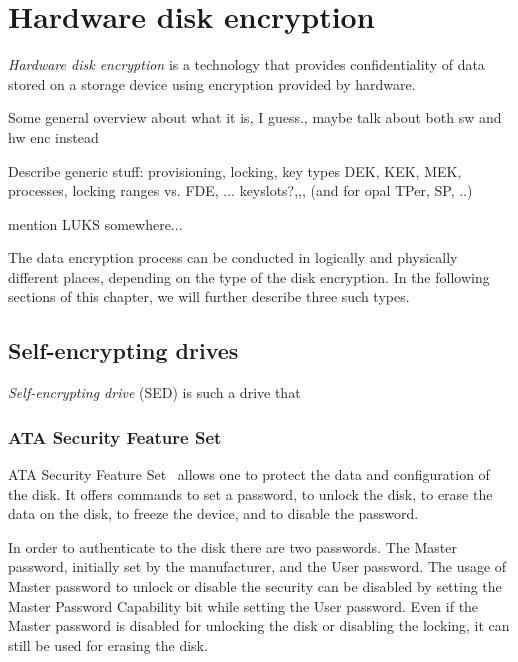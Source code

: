 
\chapter{Hardware disk encryption}

\emph{Hardware disk encryption} is a technology that provides confidentiality of data stored on a storage device using encryption provided by hardware.

Some general overview about what it is, I guess., maybe talk about both sw and hw enc instead

Describe generic stuff: provisioning, locking, key types DEK, KEK, MEK, processes, locking ranges vs. FDE, ... keyslots?,,, (and for opal TPer, SP, ..)

mention LUKS somewhere...

The data encryption process can be conducted in logically and physically different places, depending on the type of the disk encryption. In the following sections of this chapter, we will further describe three such types.

\section{Self-encrypting drives}

\emph{Self-encrypting drive} (SED) is such a drive that 



\subsection{ATA Security Feature Set}

ATA Security Feature Set~\cite{acs-3} allows one to protect the data and configuration of the disk.
It offers commands to set a password, to unlock the disk, to erase the data on the disk, to freeze the device, and to disable the password.

In order to authenticate to the disk there are two passwords. 
The Master password, initially set by the manufacturer, and the User password.
The usage of Master password to unlock or disable the security can be disabled by setting the Master Password Capability bit while setting the User password. Even if the Master password is disabled for unlocking the disk or disabling the locking, it can still be used for erasing the disk.

